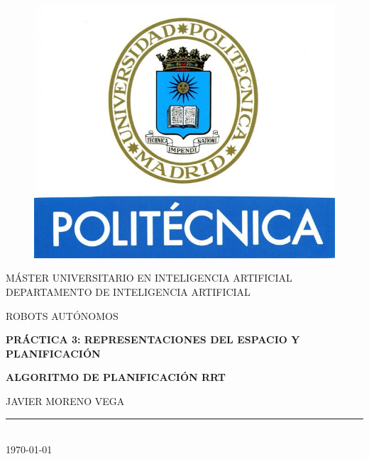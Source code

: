 \documentclass[14pt]{extarticle}
\theoremstyle{definition}
\theoremstyle{remark}
\begin{document}
\begin{titlepage}

\begin{center}
\vspace*{-1in}
\begin{figure}[htb]
\begin{center}
\includegraphics{upm.jpg}
\end{center}
\end{figure}
MÁSTER UNIVERSITARIO EN INTELIGENCIA ARTIFICIAL\\
\vspace*{0.15in}
DEPARTAMENTO DE INTELIGENCIA ARTIFICIAL \\
\vspace*{0.6in}
\begin{large}
ROBOTS AUTÓNOMOS\\
\end{large}
\vspace*{0.2in}
\begin{Large}
\textbf{PRÁCTICA 3: REPRESENTACIONES DEL ESPACIO Y PLANIFICACIÓN} \\
\end{Large}
\vspace*{0.3in}
\begin{Large}
\textbf{ALGORITMO DE PLANIFICACIÓN RRT} \\
\end{Large}
\vspace*{0.3in}
\begin{large}
JAVIER MORENO VEGA\\
\end{large}
\vspace*{0.3in}
\rule{80mm}{0.1mm}\\
\vspace*{0.1in}
\today
\end{center}
\end{titlepage}
\newpage
\tableofcontents %
\cleardoublepage
\end{document}
